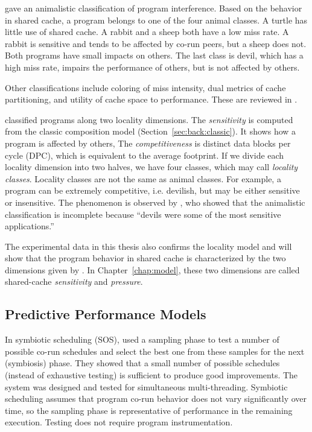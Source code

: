 \citet{XieL:MSI08} gave an animalistic classification of program
interference.  Based on the behavior in shared cache, a program
belongs to one of the four animal classes.  A turtle has little use of
shared cache.  A rabbit and a sheep both have a low miss rate.  A
rabbit is sensitive and tends to be affected by co-run peers, but a
sheep does not.  Both programs have small impacts on others.  The last
class is devil, which has a high miss rate, impairs the performance of
others, but is not affected by others.  

Other classifications include coloring of miss intensity, dual metrics
of cache partitioning, and utility of cache space to performance.
These are reviewed in \citet{XieL:MSI08}.

\citet{Jiang+:HiPEAC10} classified programs along two locality
dimensions.  The \emph{sensitivity} is computed from the classic
composition model (Section~\ref{sec:back:classic}).  It shows how a
program is affected by others, The \emph{competitiveness} is distinct
data blocks per cycle (DPC), which is equivalent to the average
footprint.  If we divide each locality dimension into two halves, we
have four classes, which may call \emph{locality classes}.  Locality
classes are not the same as animal classes.  For example, a program
can be extremely competitive, i.e.  devilish, but may be either
sensitive or insensitive.  The phenomenon is observed by
\citet{Zhuravlev+:ASPLOS10}, who showed that the animalistic
classification is incomplete because ``devils were some of the most
sensitive applications.''  

The experimental data in this thesis also confirms the locality model
and will show that the program behavior in shared cache is
characterized by the two dimensions given by \citet{Jiang+:HiPEAC10}.
In Chapter~\ref{chap:model}, these two dimensions are called
shared-cache \emph{sensitivity} and \emph{pressure}.  


\subsection{Predictive Performance Models}

In symbiotic scheduling (SOS), \citet{SnavelyT:ASPLOS00} used a
sampling phase to test a number of possible co-run schedules and
select the best one from these samples for the next (symbiosis) phase.
They showed that a small number of possible schedules (instead of
exhaustive testing) is sufficient to produce good improvements.  The
system was designed and tested for simultaneous multi-threading.
Symbiotic scheduling assumes that program co-run behavior does not vary
significantly over time, so the sampling phase is representative of
performance in the remaining execution.  Testing does not require
program instrumentation.


